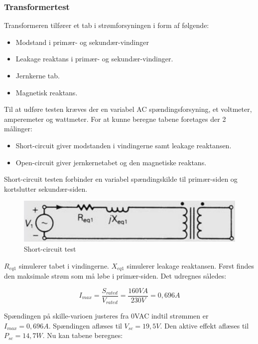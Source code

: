\subsubsection{Transformertest}
Transformeren tilfører et tab i strømforsyningen i form af følgende:
\begin{itemize}
\item Modstand i primær- og sekundær-vindinger
\item Leakage reaktans i primær- og sekundær-vindinger.
\item Jernkerne tab.
\item Magnetisk reaktans.
\end{itemize}

Til at udføre testen kræves der en variabel AC spændingsforsyning, et voltmeter, amperemeter og wattmeter. For at kunne beregne tabene foretages der 2 målinger:
\begin{itemize}
\item Short-circuit giver modstanden i vindingerne samt leakage reaktansen.
\item Open-circuit giver jernkernetabet og den magnetiske reaktans.
\end{itemize}


Short-circuit testen forbinder en variabel spændingskilde til primær-siden og kortslutter sekundær-siden.

\begin{figure}[H]
	\centering
	\includegraphics[scale=0.25]{../Hardware/PSU/Transformer/ShortCircuit}
	\caption{Short-circuit test}
	\label{photo:ShortCircuit}
\end{figure}

$R_{eq1}$ simulerer tabet i vindingerne. $X_{eq1}$ simulerer leakage reaktansen. Først findes den maksimale strøm som må løbe i primær-siden. Det udregnes således:

\begin{equation}
	I_{max} = \frac{S_{rated}}{V_{rated}} = \frac{160VA}{230V} = 0,696A
\end{equation} 

Spændingen på skille-varioen justeres fra 0VAC indtil strømmen er $I_{max} = 0,696A$. Spændingen aflæses til $V_{sc} = 19,5V$. Den aktive effekt aflæses til $P_{sc} = 14,7W$. Nu kan tabene beregnes:

